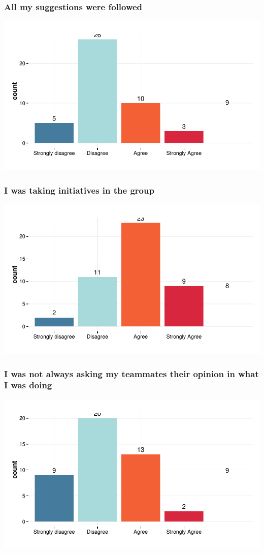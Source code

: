 \documentclass{article}
\begin{document}
\subsubsection{All my suggestions were followed}
\includegraphics{Raw_num/plots/-plot_suggestions_followed}

\subsubsection{I was taking initiatives in the group}
\includegraphics{Raw_num/plots/-plot_take_initiatives}

\subsubsection{I was not always asking my teammates their opinion in what I was doing}
\includegraphics{Raw_num/plots/-plot_solo_worker}
\end{document}
